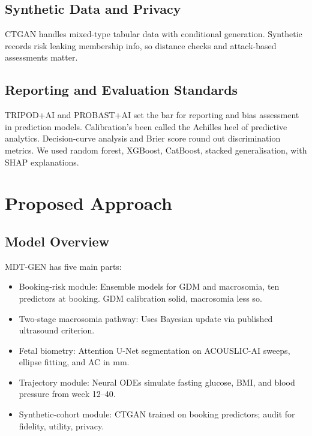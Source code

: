 \documentclass[conference]{IEEEtran}
\begin{document}
\subsection{Synthetic Data and Privacy}

CTGAN handles mixed-type tabular data with conditional generation. Synthetic records risk leaking membership info, so distance checks and attack-based assessments matter.



\subsection{Reporting and Evaluation Standards}

TRIPOD+AI and PROBAST+AI set the bar for reporting and bias assessment in prediction models. Calibration's been called the Achilles heel of predictive analytics. Decision-curve analysis and Brier score round out discrimination metrics. We used random forest, XGBoost, CatBoost, stacked generalisation, with SHAP explanations.



\section{Proposed Approach}

\subsection{Model Overview}

MDT-GEN has five main parts:



\begin{itemize}

\item Booking-risk module: Ensemble models for GDM and macrosomia, ten predictors at booking. GDM calibration solid, macrosomia less so.

\item Two-stage macrosomia pathway: Uses Bayesian update via published ultrasound criterion.

\item Fetal biometry: Attention U-Net segmentation on ACOUSLIC-AI sweeps, ellipse fitting, and AC in mm.

\item Trajectory module: Neural ODEs simulate fasting glucose, BMI, and blood pressure from week 12--40.

\item Synthetic-cohort module: CTGAN trained on booking predictors; audit for fidelity, utility, privacy.

\end{itemize}
\end{document}
